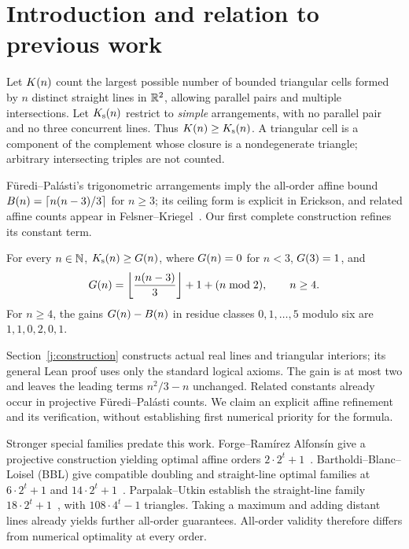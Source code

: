 \section{Introduction and relation to previous work}

Let $K(n)$ count the largest possible number of bounded triangular cells formed by $n$ distinct straight lines in $\mathbb R^2$, allowing parallel pairs and multiple intersections. Let $K_{\mathrm s}(n)$ restrict to \emph{simple} arrangements, with no parallel pair and no three concurrent lines. Thus $K(n)\ge K_{\mathrm s}(n)$. A triangular cell is a component of the complement whose closure is a nondegenerate triangle; arbitrary intersecting triples are not counted.

F\"uredi--Pal\'asti's trigonometric arrangements imply the all-order affine bound $B(n)=\left\lceil n(n-3)/3\right\rceil$ for $n\ge3$; its ceiling form is explicit in Erickson, and related affine counts appear in Felsner--Kriegel~\cite{furedipalasti1984,erickson1999,felsnerkriegel1999}. Our first complete construction refines its constant term.

\begin{theorem}\label{j:main}
For every $n\in\mathbb N$, $K_{\mathrm s}(n)\ge G(n)$, where $G(n)=0$ for $n<3$, $G(3)=1$, and
\begin{equation}\label{j:G}
 G(n)=\left\lfloor\frac{n(n-3)}3\right\rfloor+1+(n\bmod2),\qquad n\ge4.
\end{equation}
For $n\ge4$, the gains $G(n)-B(n)$ in residue classes $0,1,\ldots,5$ modulo six are $1,1,0,2,0,1$.
\end{theorem}

Section~\ref{j:construction} constructs actual real lines and triangular interiors; its general Lean proof uses only the standard logical axioms. The gain is at most two and leaves the leading terms $n^2/3-n$ unchanged. Related constants already occur in projective F\"uredi--Pal\'asti counts. We claim an explicit affine refinement and its verification, without establishing first numerical priority for the formula.

Stronger special families predate this work. Forge--Ram\'irez Alfons\'in give a projective construction yielding optimal affine orders $2\cdot2^t+1$~\cite{forge1998}. Bartholdi--Blanc--Loisel (BBL) give compatible doubling and straight-line optimal families at $6\cdot2^t+1$ and $14\cdot2^t+1$~\cite{bbl2008}. Parpalak--Utkin establish the straight-line family $18\cdot2^t+1$~\cite{parpalakutkin2026}, with $108\cdot4^t-1$ triangles. Taking a maximum and adding distant lines already yields further all-order guarantees. All-order validity therefore differs from numerical optimality at every order.

